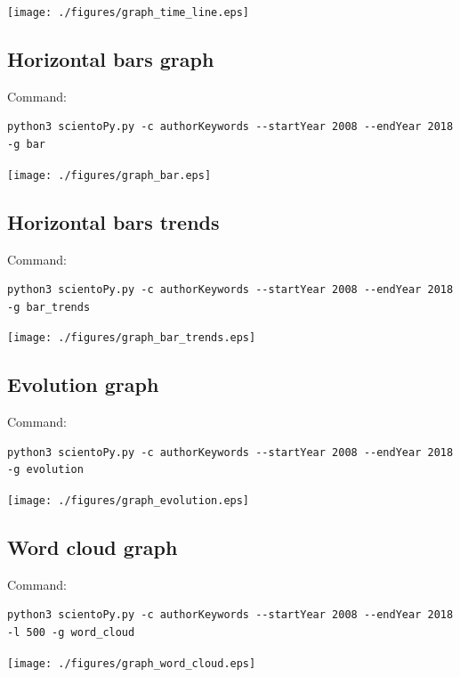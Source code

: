 \documentclass[10pt,letterpaper]{article}
\begin{document}
\begin{center}
	\texttt{[image: ./figures/graph\_time\_line.eps]}
\end{center}

\subsection{Horizontal bars graph}
Command: 
\begin{verbatim}
python3 scientoPy.py -c authorKeywords --startYear 2008 --endYear 2018 -g bar
\end{verbatim}

\begin{center}
	\texttt{[image: ./figures/graph\_bar.eps]}
\end{center}

\subsection{Horizontal bars trends}
Command: 
\begin{verbatim}
python3 scientoPy.py -c authorKeywords --startYear 2008 --endYear 2018 -g bar_trends
\end{verbatim}

\begin{center}
	\texttt{[image: ./figures/graph\_bar\_trends.eps]}
\end{center}

\subsection{Evolution graph}
Command: 
\begin{verbatim}
python3 scientoPy.py -c authorKeywords --startYear 2008 --endYear 2018 -g evolution
\end{verbatim}

\begin{center}
	\texttt{[image: ./figures/graph\_evolution.eps]}
\end{center}


\subsection{Word cloud graph}
Command: 
\begin{verbatim}
python3 scientoPy.py -c authorKeywords --startYear 2008 --endYear 2018 -l 500 -g word_cloud
\end{verbatim}

\begin{center}
	\texttt{[image: ./figures/graph\_word\_cloud.eps]}
\end{center}
\end{document}

